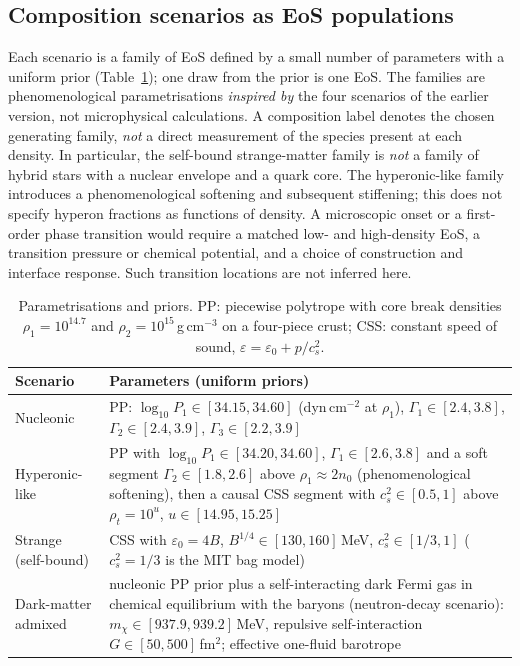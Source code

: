 \documentclass[11pt,a4paper]{article}
\begin{document}
\subsection{Composition scenarios as EoS populations}
Each scenario is a family of EoS defined by a small number of parameters with a uniform prior (Table~\ref{tab:priors}); one draw from the prior is one EoS. The families are phenomenological parametrisations \emph{inspired by} the four scenarios of the earlier version, not microphysical calculations. A composition label denotes the chosen generating family, \emph{not} a direct measurement of the species present at each density. In particular, the self-bound strange-matter family is \emph{not} a family of hybrid stars with a nuclear envelope and a quark core. The hyperonic-like family introduces a phenomenological softening and subsequent stiffening; this does not specify hyperon fractions as functions of density. A microscopic onset or a first-order phase transition would require a matched low- and high-density EoS, a transition pressure or chemical potential, and a choice of construction and interface response. Such transition locations are not inferred here.
\begin{table}[htbp]\centering\small
\caption{Parametrisations and priors. PP: piecewise polytrope \citep{Read09} with core break densities $\rho_1=10^{14.7}$ and $\rho_2=10^{15}$\,g\,cm$^{-3}$ on a four-piece crust; CSS: constant speed of sound, $\varepsilon=\varepsilon_0+p/c_s^2$.}\label{tab:priors}
\begin{tabular}{>{\raggedright\arraybackslash}p{}p{}}\toprule
Scenario & Parameters (uniform priors)\\\midrule
Nucleonic & PP: $\log_{10}P_1\in[34.15,34.60]$ (dyn\,cm$^{-2}$ at $\rho_1$), $\Gamma_1\in[2.4,3.8]$, $\Gamma_2\in[2.4,3.9]$, $\Gamma_3\in[2.2,3.9]$\\
Hyperonic-like & PP with $\log_{10}P_1\in[34.20,34.60]$, $\Gamma_1\in[2.6,3.8]$ and a soft segment $\Gamma_2\in[1.8,2.6]$ above $\rho_1\approx2n_0$ (phenomenological softening), then a causal CSS segment with $c_s^2\in[0.5,1]$ above $\rho_t=10^{u}$, $u\in[14.95,15.25]$\\
Strange (self-bound) & CSS with $\varepsilon_0=4B$, $B^{1/4}\in[130,160]$\,MeV, $c_s^2\in[1/3,1]$ ($c_s^2=1/3$ is the MIT bag model)\\
Dark-matter admixed & nucleonic PP prior plus a self-interacting dark Fermi gas in chemical equilibrium with the baryons (neutron-decay scenario): $m_\chi\in[937.9,939.2]$\,MeV, repulsive self-interaction $G\in[50,500]$\,fm$^2$; effective one-fluid barotrope\\\bottomrule\end{tabular}\end{table}
\end{document}
